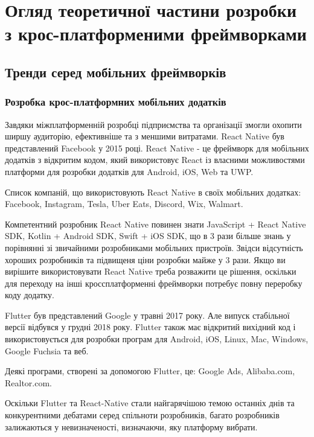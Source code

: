 \renewcommand{\proofname}{Доведення}
\renewcommand{\chaptername}{РОЗДІЛ}


\chapter{Огляд теоретичної частини розробки з крос-платформеними фреймворками}
\label{ch1}


\section{Тренди серед мобільних фреймворків}
\label{sec:trends}

\subsection{Розробка крос-платформних мобільних додатків}
\label{subsec:cross_platform_dev}
Завдяки міжплатформенній розробці підприємства та організації змогли охопити ширшу аудиторію, ефективніше та з меншими витратами.
React Native був представлений Facebook у 2015 році.
React Native - це фреймворк для мобільних додатків з відкритим кодом, який використовує React із власними можливостями платформи для розробки додатків для Android, iOS, Web та UWP.

Список компаній, що використовують React Native в своїх мобільних додатках: Facebook, Instagram, Tesla, Uber Eats, Discord, Wix, Walmart.

Компетентний розробник React Native повинен знати JavaScript + React Native SDK, Kotlin + Android SDK, Swift + iOS SDK, що в 3 рази більше знань у порівнянні зі звичайними розробниками мобільних пристроїв.
Звідси відсутність хороших розробників та підвищеня ціни розробки майже у 3 рази.
Якщо ви вирішите використовувати React Native треба розважити це рішення, оскільки для переходу на інші кроссплатформенні
фреймворки потребує повну переробку коду додатку.

Flutter був представлений Google у травні 2017 року. Але випуск стабільної версії відбувся у грудні 2018 року.
Flutter також має відкритий вихідний код і використовується для розробки програм для Android, iOS, Linux, Mac, Windows, Google Fuchsia та веб.

Деякі програми, створені за допомогою Flutter, це: Google Ads, Alibaba.com, Realtor.com.

Оскільки Flutter та React-Native стали найгарячішою темою останніх днів
та конкурентними дебатами серед спільноти розробників, багато розробників залижаються у невизначеності, визначаючи, яку платформу вибрати.

